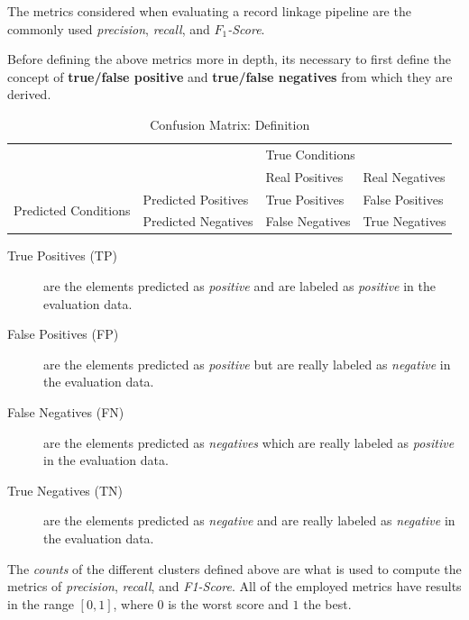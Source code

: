 \documentclass[epsfig,a4paper,11pt,titlepage,twoside,openany]{book}
\begin{document}
The metrics considered when evaluating a record linkage pipeline are the commonly used
\cite{Powers2011_evaluation} \textit{precision}, \textit{recall}, and
\textit{$F_1$-Score}.

Before defining the above metrics more in depth, its necessary to first define the concept of \textbf{true/false positive} and \textbf{true/false negatives} from which they are derived.

\begin{table}[H]
  \centering
  \begin{tabular}{ll|l|l|}
    \cline{3-4}
    &                     & \multicolumn{2}{l|}{True Conditions} \\ \cline{3-4} 
    &                     & Real Positives  & Real Negatives     \\ \hline
    \multicolumn{1}{|l|}{\multirow{2}{*}{Predicted Conditions}} & Predicted Positives & True Positives  & False Positives    \\ \cline{2-4} 
    \multicolumn{1}{|l|}{}                                      & Predicted Negatives & False Negatives & True Negatives     \\ \hline
  \end{tabular}
  \caption{Confusion Matrix: Definition}
  \label{tab:confusion-matrix-definition}
\end{table}

\begin{description}
\item[True Positives (TP)] are the elements predicted as \textit{positive}
  and are labeled as \textit{positive} in the evaluation data.
 
\item[False Positives (FP)] are the elements predicted as \textit{positive}
  but are really labeled as \textit{negative} in the evaluation data.
 
\item[False Negatives (FN)] are the elements predicted as \textit{negatives}
  which are really labeled as \textit{positive} in the evaluation data.
 
\item[True Negatives (TN)] are the elements predicted as \textit{negative}
  and are really labeled as \textit{negative} in the evaluation data.
\end{description}


The \textit{counts} of the different clusters defined above are what is used to compute the metrics of \textit{precision}, \textit{recall}, and \textit{F1-Score}. All of the employed metrics have results in the range $[0,1]$, where $0$ is the worst score and $1$ the best.
\end{document}
